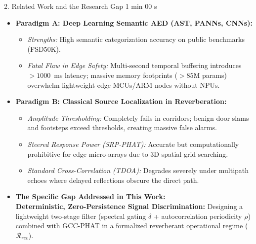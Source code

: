 \documentclass[aspectratio=169,10pt]{beamer}
\begin{document}
\begin{frame}{2. Related Work and the Research Gap \hfill {\small\color{gray}1 min 00 s}}
\begin{itemize}
    \setlength{\itemsep}{0.8em}
    \item \textbf{Paradigm A: Deep Learning Semantic AED (AST, PANNs, CNNs):}
    \begin{itemize}
        \item \textit{Strengths:} High semantic categorization accuracy on public benchmarks (FSD50K).
        \item \textit{Fatal Flaw in Edge Safety:} Multi-second temporal buffering introduces $>1000$~ms latency; massive memory footprints ($>85\text{M}$ params) overwhelm lightweight edge MCUs/ARM nodes without NPUs.
    \end{itemize}
    
    \item \textbf{Paradigm B: Classical Source Localization in Reverberation:}
    \begin{itemize}
        \item \textit{Amplitude Thresholding:} Completely fails in corridors; benign door slams and footsteps exceed thresholds, creating massive false alarms.
        \item \textit{Steered Response Power (SRP-PHAT):} Accurate but computationally prohibitive for edge micro-arrays due to 3D spatial grid searching.
        \item \textit{Standard Cross-Correlation (TDOA):} Degrades severely under multipath echoes where delayed reflections obscure the direct path.
    \end{itemize}
    
    \item \textbf{The Specific Gap Addressed in This Work:} \\
    \textbf{Deterministic, Zero-Persistence Signal Discrimination:} Designing a lightweight two-stage filter (spectral gating $\delta$ + autocorrelation periodicity $\rho$) combined with GCC-PHAT in a formalized reverberant operational regime ($\mathcal{R}_{rev}$).
\end{itemize}
\end{frame}
\end{document}
